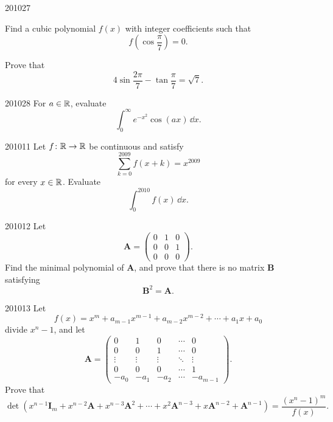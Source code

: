 \begin{problem}{2010}{2}{7}
\begin{problemsubparts}
    \item Find a cubic polynomial $f(x)$ with integer coefficients such that
    \[
        f\!\left(\cos\frac\pi7\right)=0.
    \]
    \item Prove that
    \[
        4\sin\frac{2\pi}{7}-\tan\frac\pi7=\sqrt7.
    \]
\end{problemsubparts}
\end{problem}

\begin{problem}{2010}{2}{8}
For $a\in\mathbb{R}$, evaluate
\[
    \int_0^{\infty}e^{-x^2}\cos(ax)\, \dd x.
\]
\end{problem}

\begin{problem}{2010}{1}{1}
Let $f\colon\mathbb{R}\to\mathbb{R}$ be continuous and satisfy
\[
    \sum_{k=0}^{2009} f(x+k)=x^{2009}
\]
for every $x\in\mathbb{R}$. Evaluate
\[
    \int_0^{2010}f(x)\, \dd x.
\]
\end{problem}

\begin{problem}{2010}{1}{2}
Let
\[
    \mathbf A=
    \begin{pmatrix}
        0&1&0\\
        0&0&1\\
        0&0&0
    \end{pmatrix}.
\]
Find the minimal polynomial of $\mathbf A$, and prove that there is no matrix $\mathbf B$ satisfying
\[
    \mathbf B^2=\mathbf A.
\]
\end{problem}

\begin{problem}{2010}{1}{3}
Let
\[
    f(x)=x^m+a_{m-1}x^{m-1}+a_{m-2}x^{m-2}+\cdots+a_1x+a_0
\]
divide $x^n-1$, and let
\[
    \mathbf A=
    \begin{pmatrix}
        0&1&0&\cdots&0\\
        0&0&1&\cdots&0\\
        \vdots&\vdots&\vdots&\ddots&\vdots\\
        0&0&0&\cdots&1\\
        -a_0&-a_1&-a_2&\cdots&-a_{m-1}
    \end{pmatrix}.
\]
Prove that
\[
    \det\!\left(
        x^{n-1}\mathbf I_m+x^{n-2}\mathbf A+x^{n-3}\mathbf A^2
        +\cdots+x^2\mathbf A^{n-3}+x\mathbf A^{n-2}+\mathbf A^{n-1}
    \right)
    =\frac{(x^n-1)^m}{f(x)}.
\]
\end{problem}

